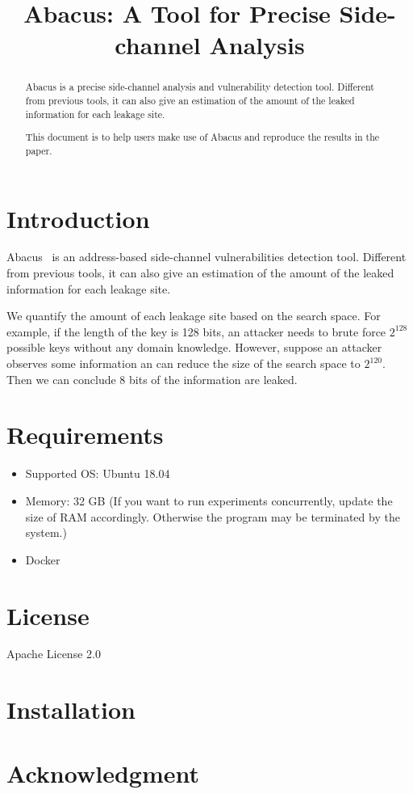 \documentclass[10pt,conference]{IEEEtran}
\newcommand{\tool}{\textsf{Abacus}}
\begin{document}
\title{\tool{}: A Tool for Precise Side-channel Analysis}
\author{
}


\maketitle

\begin{abstract}
Abacus is a precise side-channel analysis and vulnerability detection
tool. Different from previous tools, it can also give an estimation
of the amount of the leaked information for each leakage site.

This document is to help users make use of Abacus and reproduce the
results in the paper.
\end{abstract}


\section{Introduction}
Abacus~\cite{bao2021abacus} is an address-based side-channel vulnerabilities detection tool. Different from previous tools, it can also give an estimation of the amount of the leaked information for each leakage site.

We quantify the amount of each leakage site based on the search space. For example, if the length of the key is 128 bits, an attacker needs to brute force $2^128$ possible keys without any domain knowledge. However, suppose an attacker observes some information an can reduce the size of the search space to $2^120$. Then we can conclude 8 bits of the information are leaked.

\section{Requirements}
\begin{itemize}
\item Supported OS: Ubuntu 18.04
\item Memory: 32 GB (If you want to run experiments concurrently, update the size of RAM
     accordingly. Otherwise the program may be terminated by the system.)
\item Docker
\end{itemize}

\section{License}
Apache License 2.0

\section{Installation}


\section*{Acknowledgment}





\end{document}
